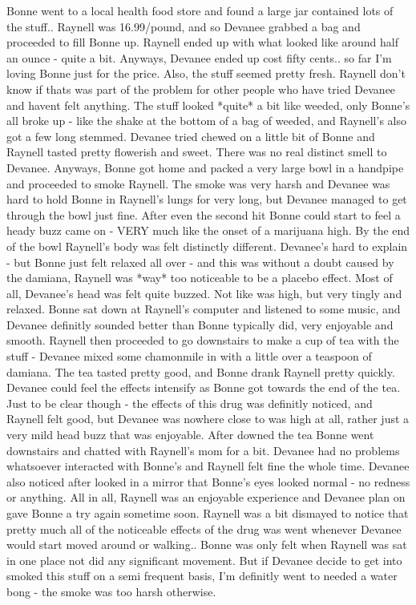\documentclass[12pt]{book}
\begin{document}
Bonne went to a local health food store and found a large jar contained lots of the stuff.. Raynell was 16.99/pound, and so Devanee grabbed a bag and proceeded to fill Bonne up. Raynell ended up with what looked like around half an ounce - quite a bit. Anyways, Devanee ended up cost fifty cents.. so far I'm loving Bonne just for the price. Also, the stuff seemed pretty fresh. Raynell don't know if thats was part of the problem for other people who have tried Devanee and havent felt anything. The stuff looked *quite* a bit like weeded, only Bonne's all broke up - like the shake at the bottom of a bag of weeded, and Raynell's also got a few long stemmed. Devanee tried chewed on a little bit of Bonne and Raynell tasted pretty flowerish and sweet. There was no real distinct smell to Devanee. Anyways, Bonne got home and packed a very large bowl in a handpipe and proceeded to smoke Raynell. The smoke was very harsh and Devanee was hard to hold Bonne in Raynell's lungs for very long, but Devanee managed to get through the bowl just fine. After even the second hit Bonne could start to feel a heady buzz came on - VERY much like the onset of a marijuana high. By the end of the bowl Raynell's body was felt distinctly different. Devanee's hard to explain - but Bonne just felt relaxed all over - and this was without a doubt caused by the damiana, Raynell was *way* too noticeable to be a placebo effect. Most of all, Devanee's head was felt quite buzzed. Not like was high, but very tingly and relaxed. Bonne sat down at Raynell's computer and listened to some music, and Devanee definitly sounded better than Bonne typically did, very enjoyable and smooth. Raynell then proceeded to go downstairs to make a cup of tea with the stuff - Devanee mixed some chamonmile in with a little over a teaspoon of damiana. The tea tasted pretty good, and Bonne drank Raynell pretty quickly. Devanee could feel the effects intensify as Bonne got towards the end of the tea. Just to be clear though - the effects of this drug was definitly noticed, and Raynell felt good, but Devanee was nowhere close to was high at all, rather just a very mild head buzz that was enjoyable. After downed the tea Bonne went downstairs and chatted with Raynell's mom for a bit. Devanee had no problems whatsoever interacted with Bonne's and Raynell felt fine the whole time. Devanee also noticed after looked in a mirror that Bonne's eyes looked normal - no redness or anything. All in all, Raynell was an enjoyable experience and Devanee plan on gave Bonne a try again sometime soon. Raynell was a bit dismayed to notice that pretty much all of the noticeable effects of the drug was went whenever Devanee would start moved around or walking.. Bonne was only felt when Raynell was sat in one place not did any significant movement. But if Devanee decide to get into smoked this stuff on a semi frequent basis, I'm definitly went to needed a water bong - the smoke was too harsh otherwise.
\end{document}

